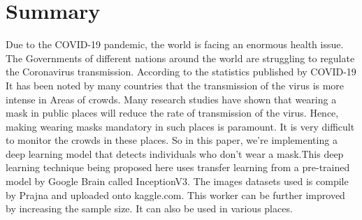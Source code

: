 \chapter{Summary}

Due to the COVID-19 pandemic, the world is facing an enormous health issue. The Governments of different nations around the world are struggling to regulate the Coronavirus transmission. According to the statistics published by COVID-19 It has been noted by many countries that the transmission of the virus is more intense in
Areas of crowds. Many research studies have shown that wearing a mask in public places will reduce the rate of transmission of the virus. Hence, making wearing masks mandatory in such places is paramount.  It is very difficult to monitor the crowds in these places. So in this paper, we're implementing a deep learning model that detects individuals who don't wear a mask.This deep learning technique being proposed here uses transfer learning from a pre-trained model by Google Brain called InceptionV3. The images datasets used is compile by Prajna and uploaded onto kaggle.com. This worker can be further improved by increasing the sample size. It can also be used in various places.
